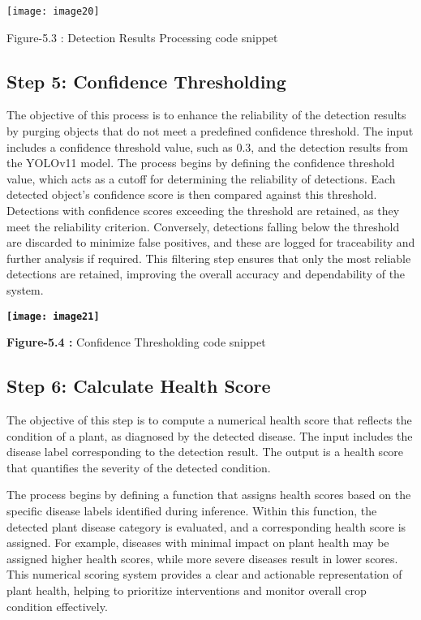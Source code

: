 \documentclass{book} %
\begin{document}
\noindent 

\noindent \texttt{[image: image20]}

   Figure-5.3 :  Detection Results Processing code snippet

\noindent 
\subsection{Step 5: Confidence Thresholding }

\noindent The objective of this process is to enhance the reliability of the detection results by purging objects that do not meet a predefined confidence threshold. The input includes a confidence threshold value, such as 0.3, and the detection results from the YOLOv11 model. The process begins by defining the confidence threshold value, which acts as a cutoff for determining the reliability of detections. Each detected object's confidence score is then compared against this threshold. Detections with confidence scores exceeding the threshold are retained, as they meet the reliability criterion. Conversely, detections falling below the threshold are discarded to minimize false positives, and these are logged for traceability and further analysis if required. This filtering step ensures that only the most reliable detections are retained, improving the overall accuracy and dependability of the system.

\noindent 

\noindent \textbf{\texttt{[image: image21]}}

\noindent \textbf{Figure-5.4 :}  Confidence Thresholding code snippet\textbf{}

\noindent 
\subsection{Step 6: Calculate Health Score }

\noindent The objective of this step is to compute a numerical health score that reflects the condition of a plant, as diagnosed by the detected disease. The input includes the disease label corresponding to the detection result. The output is a health score that quantifies the severity of the detected condition.

\noindent The process begins by defining a function that assigns health scores based on the specific disease labels identified during inference. Within this function, the detected plant disease category is evaluated, and a corresponding health score is assigned. For example, diseases with minimal impact on plant health may be assigned higher health scores, while more severe diseases result in lower scores. This numerical scoring system provides a clear and actionable representation of plant health, helping to prioritize interventions and monitor overall crop condition effectively.
\end{document}
